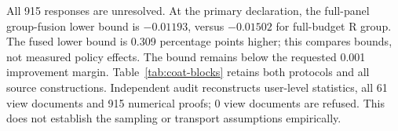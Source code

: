 All 915 responses are unresolved. At the primary declaration, the full-panel group-fusion lower bound is $-0.01193$, versus $-0.01502$ for full-budget R group. The fused lower bound is 0.309 percentage points higher; this compares bounds, not measured policy effects. The bound remains below the requested 0.001 improvement margin. Table~\ref{tab:coat-blocks} retains both protocols and all source constructions. Independent audit reconstructs user-level statistics, all 61 view documents and 915 numerical proofs; 0 view documents are refused. This does not establish the sampling or transport assumptions empirically.
